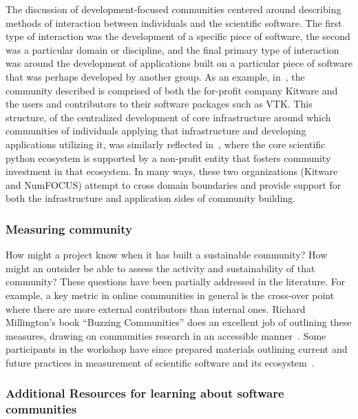 \documentclass[11pt, oneside]{amsart}
\newcommand{\katznote}[1]{ {\textcolor{magenta}    { ***Dan:      #1 }}}
\newcommand{\toolname}[1] {\textsf{#1}}
\begin{document}
The discussion of development-focused communities centered around
describing methods of interaction between individuals and the
scientific software.  The first type of interaction was the
development of a specific piece of software, the second was a
particular domain or discipline, and the final primary type of
interaction was around the development of applications built on a
particular piece of software that was perhaps developed by another
group.  As an example, in~\cite{Hanwell_WSSSPE}, the community
described is comprised of both the for-profit company
\toolname{Kitware} and the users and contributors to their software
packages such as \toolname{VTK}.  This structure, of the centralized
development of core infrastructure around which communities of
individuals applying that infrastructure and developing applications
utilizing it, was similarly reflected in~\cite{Terrel_WSSSPE}, where
the core scientific python ecosystem is supported by a non-profit
entity that fosters community investment in that ecosystem.  In many
ways, these two organizations (\toolname{Kitware} and
\toolname{NumFOCUS}) attempt to cross domain boundaries and provide
support for both the infrastructure and application sides of community
building.

\subsubsection{Measuring community}
How might a project know when it has built a sustainable community?
How might an outsider be able to assess the activity and
sustainability of that community?  These questions have been partially
addressed in the literature.  For example, a key metric in online
communities in general is the cross-over point where there are more
external contributors than internal ones. Richard Millington's book
``Buzzing Communities'' does an excellent job of outlining these
measures, drawing on communities research in an accessible
manner~\cite{millington_buzzing_2012}. Some participants in the
workshop have since prepared materials outlining current and
future practices in measurement of scientific software and its
ecosystem~\cite{metrics-web}.

\subsubsection{Additional Resources for learning about software communities}
\end{document}
